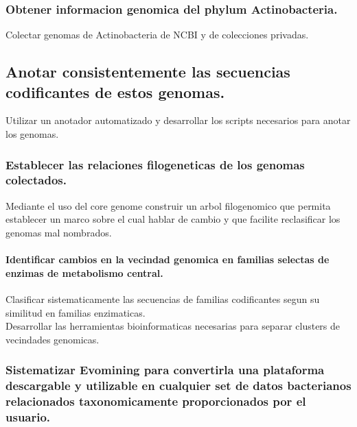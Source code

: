 \documentclass[12pt,twoside]{reedthesis}
\begin{document}
  \subsubsection{Obtener informacion genomica del phylum
  Actinobacteria.}\label{obtener-informacion-genomica-del-phylum-actinobacteria.}
  
  Colectar genomas de Actinobacteria de NCBI y de colecciones privadas.
  
  \subsection{Anotar consistentemente las secuencias codificantes de estos
  genomas.}\label{anotar-consistentemente-las-secuencias-codificantes-de-estos-genomas.}
  
  Utilizar un anotador automatizado y desarrollar los scripts necesarios
  para anotar los genomas.
  
  \subsubsection{Establecer las relaciones filogeneticas de los genomas
  colectados.}\label{establecer-las-relaciones-filogeneticas-de-los-genomas-colectados.}
  
  Mediante el uso del core genome construir un arbol filogenomico que
  permita establecer un marco sobre el cual hablar de cambio y que
  facilite reclasificar los genomas mal nombrados.
  
  \paragraph{Identificar cambios en la vecindad genomica en familias
  selectas de enzimas de metabolismo
  central.}\label{identificar-cambios-en-la-vecindad-genomica-en-familias-selectas-de-enzimas-de-metabolismo-central.}
  
  Clasificar sistematicamente las secuencias de familias codificantes
  segun su similitud en familias enzimaticas.\\
  Desarrollar las herramientas bioinformaticas necesarias para separar
  clusters de vecindades genomicas.
  
  \subsubsection{Sistematizar Evomining para convertirla una plataforma
  descargable y utilizable en cualquier set de datos bacterianos
  relacionados taxonomicamente proporcionados por el
  usuario.}\label{sistematizar-evomining-para-convertirla-una-plataforma-descargable-y-utilizable-en-cualquier-set-de-datos-bacterianos-relacionados-taxonomicamente-proporcionados-por-el-usuario.}
  
\end{document}
